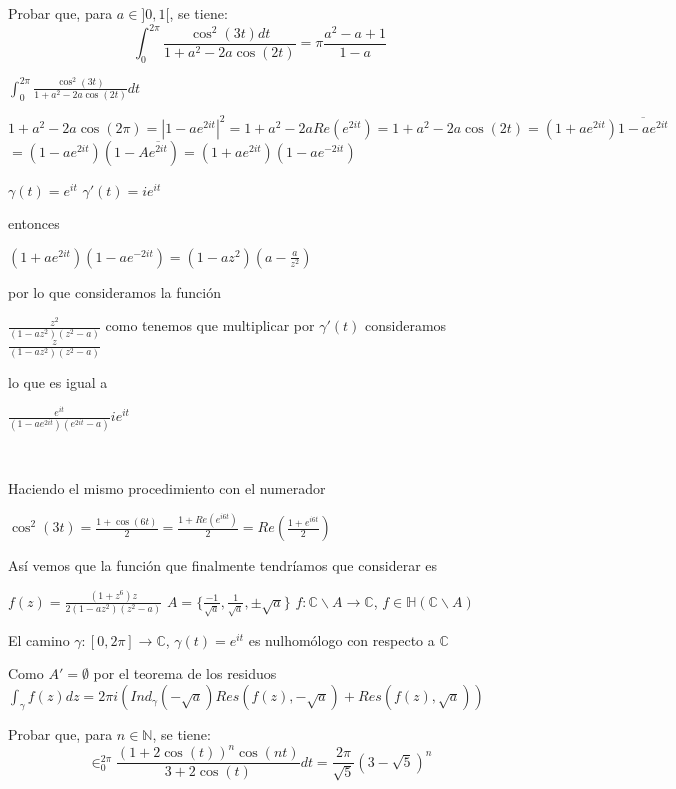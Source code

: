 \begin{ejer}
	Probar que, para $a\in]0,1[$, se tiene:
	$$ \int_0^{2\pi} \frac{\cos^2(3t)dt}{1+a^2-2a\cos(2t)} = \pi\frac{a^2-a+1}{1-a} $$
\end{ejer}

\begin{sol}

$\int_{0}^{2\pi} \frac{\cos^2(3t)}{1+a^2-2a\cos(2t)} dt$

$1+a^2-2a\cos(2\pi) = |1-ae^{2it}|^2 = 1+a^2-2aRe(e^{2it}) =  1+a^2-2a\cos(2t) = (1+ae^{2it})\overline{1-ae^{2it}}$
$= (1-ae^{2it})(1-A\overline{e^{2it}}) = (1+ae^{2it})(1-ae^{-2it})$

$\gamma(t) = e^{it}$
$\gamma'(t) = ie^{it}$

entonces

$(1+ae^{2it})(1-ae^{-2it}) = (1-az^2)(a-\frac{a}{z^2})$

por lo que consideramos la función 

$\frac{z^2}{(1-az^2)(z^2-a)}$ 
como tenemos que multiplicar por $\gamma'(t)$ consideramos $\frac{z}{(1-az^2)(z^2-a)}$

lo que es igual a

$\frac{e^{it}}{(1-ae^{2it})(e^{2it}-a)} ie^{it}$

\

Haciendo el mismo procedimiento con el numerador

$\cos^2(3t) = \frac{1+\cos(6t)}{2} = \frac{1+Re(e^{i6t})}{2} = Re(\frac{1+e^{i6t}}{2})$


Así vemos que la función que finalmente tendríamos que considerar es

$f(z) = \frac{(1+z^6)z}{2(1-az^2)(z^2-a)}$
$A = \{ \frac{-1}{\sqrt{a}}, \frac{1}{\sqrt{a}}, \pm\sqrt{a} \}$
$f:\mathbb{C}\backslash A \rightarrow \mathbb{C}$, $f\in\mathbb{H}(\mathbb{C}\backslash A)$

El camino $\gamma:[0,2\pi] \rightarrow \mathbb{C}$, $\gamma(t) = e^{it}$ es nulhomólogo con respecto a $\mathbb{C}$

Como $A' = \emptyset$ por el teorema de los residuos
$\int_{\gamma} f(z)dz = 2\pi i \left( Ind_{\gamma}(-\sqrt{a})Res(f(z),-\sqrt{a}) + Res(f(z), \sqrt{a}) \right)$
\end{sol}

\begin{ejer}
	Probar que, para $n\in\mathbb{N}$, se tiene:
	$$ \in_0^{2\pi} \frac{(1+2\cos(t))^n \cos(nt)}{3+2\cos(t)} dt = \frac{2\pi}{\sqrt{5}} (3-\sqrt{5})^n $$
\end{ejer}


